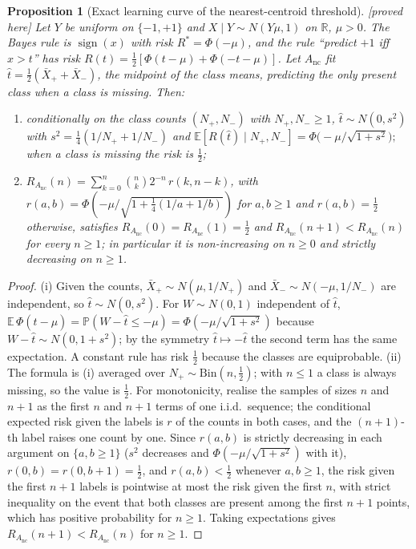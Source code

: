 \documentclass[11pt,a4paper]{article}
\theoremstyle{plain}
\newtheorem{proposition}[theorem]{Proposition}
\theoremstyle{definition}
\theoremstyle{remark}
\newcommand{\R}{\mathbb{R}}
\newcommand{\E}{\mathbb{E}}
\newcommand{\Prob}{\mathbb{P}}
\newcommand{\sgn}{\operatorname{sign}}
\newcommand{\Risk}{R}
\newcommand{\status}[1]{\textsf{\small [#1]}}
\begin{document}
\begin{proposition}[Exact learning curve of the nearest-centroid threshold]\label{prop:exact}\status{proved here}
Let $Y$ be uniform on $\{-1,+1\}$ and $X\mid Y\sim N(Y\mu,1)$ on $\R$, $\mu>0$. The Bayes rule is $\sgn(x)$ with risk $\Risk^*=\Phi(-\mu)$, and the rule ``predict $+1$ iff $x>t$'' has risk $\Risk(t)=\tfrac12[\Phi(t-\mu)+\Phi(-t-\mu)]$. Let $A_{\mathrm{nc}}$ fit $\hat t=\tfrac12(\bar X_++\bar X_-)$, the midpoint of the class means, predicting the only present class when a class is missing. Then:
\begin{enumerate}[leftmargin=2em,label=(\roman*),itemsep=1pt]
\item conditionally on the class counts $(N_+,N_-)$ with $N_+,N_-\ge1$, $\hat t\sim N(0,s^2)$ with $s^2=\tfrac14(1/N_++1/N_-)$ and
\(
\E[\Risk(\hat t)\mid N_+,N_-]=\Phi\bigl(-\mu/\sqrt{1+s^2}\bigr);
\)
when a class is missing the risk is $\tfrac12$;
\item $\Risk_{A_{\mathrm{nc}}}(n)=\sum_{k=0}^{n}\binom nk 2^{-n}\,r(k,n-k)$, with $r(a,b)=\Phi(-\mu/\sqrt{1+\tfrac14(1/a+1/b)})$ for $a,b\ge1$ and $r(a,b)=\tfrac12$ otherwise, satisfies $\Risk_{A_{\mathrm{nc}}}(0)=\Risk_{A_{\mathrm{nc}}}(1)=\tfrac12$ and $\Risk_{A_{\mathrm{nc}}}(n+1)<\Risk_{A_{\mathrm{nc}}}(n)$ for every $n\ge1$; in particular it is non-increasing on $n\ge0$ and strictly decreasing on $n\ge1$.
\end{enumerate}
\end{proposition}
\begin{proof}
(i) Given the counts, $\bar X_+\sim N(\mu,1/N_+)$ and $\bar X_-\sim N(-\mu,1/N_-)$ are independent, so $\hat t\sim N(0,s^2)$. For $W\sim N(0,1)$ independent of $\hat t$, $\E\,\Phi(\hat t-\mu)=\Prob(W-\hat t\le-\mu)=\Phi(-\mu/\sqrt{1+s^2})$ because $W-\hat t\sim N(0,1+s^2)$; by the symmetry $\hat t\mapsto-\hat t$ the second term has the same expectation. A constant rule has risk $\tfrac12$ because the classes are equiprobable. (ii) The formula is (i) averaged over $N_+\sim\mathrm{Bin}(n,\tfrac12)$; with $n\le1$ a class is always missing, so the value is $\tfrac12$. For monotonicity, realise the samples of sizes $n$ and $n+1$ as the first $n$ and $n+1$ terms of one i.i.d.\ sequence; the conditional expected risk given the labels is $r$ of the counts in both cases, and the $(n+1)$-th label raises one count by one. Since $r(a,b)$ is strictly decreasing in each argument on $\{a,b\ge1\}$ ($s^2$ decreases and $\Phi(-\mu/\sqrt{1+s^2})$ with it), $r(0,b)=r(0,b+1)=\tfrac12$, and $r(a,b)<\tfrac12$ whenever $a,b\ge1$, the risk given the first $n+1$ labels is pointwise at most the risk given the first $n$, with strict inequality on the event that both classes are present among the first $n+1$ points, which has positive probability for $n\ge1$. Taking expectations gives $\Risk_{A_{\mathrm{nc}}}(n+1)<\Risk_{A_{\mathrm{nc}}}(n)$ for $n\ge1$.
\end{proof}
\end{document}
